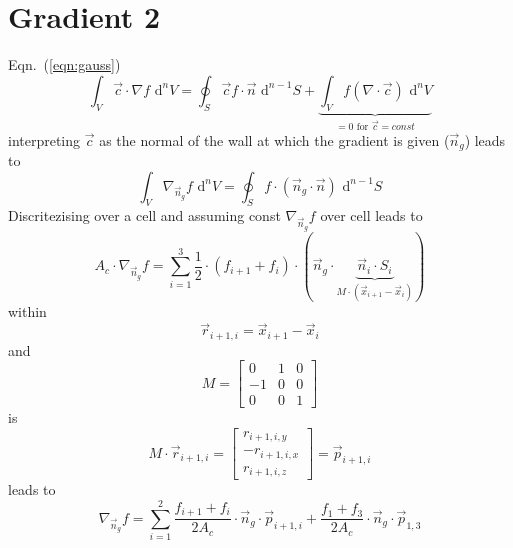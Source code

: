 \section{Gradient 2}
Eqn.~(\ref{eqn:gauss})
\begin{equation}
  \int_V \vec{c} \cdot \nabla f \,\, \mathrm{d}^n V = \oint_S \vec{c} f \cdot \vec{n} \,\, \mathrm{d}^{n-1}S + \underbrace{\int_V f (\nabla \cdot \vec{c}) \,\, \mathrm{d}^n V}_{=0 \text{ for } \vec{c} = const}
\end{equation}
interpreting $\vec{c}$ as the normal of the wall at which the gradient is given ($\vec{n}_g$) leads to
\begin{equation}
  \int_V \nabla_{\vec{n}_g} f \,\, \mathrm{d}^n V = \oint_S f \cdot (\vec{n}_g  \cdot \vec{n}) \,\, \mathrm{d}^{n-1}S
\end{equation}
Discritezising over a cell and assuming const $\nabla_{\vec{n}_g} f$ over cell leads to
\begin{equation}
  A_c \cdot \nabla_{\vec{n}_g}f  = \sum_{i=1}^3 \frac{1}{2} \cdot (f_{i + 1} + f_i) \cdot (\vec{n}_g  \cdot \underbrace{\vec{n}_i \cdot S_i}_{M \cdot (\vec{x}_{i + 1} - \vec{x}_{i})})
\end{equation}
within\begin{equation}
  \vec{r}_{i+1, i} = \vec{x}_{i + 1} - \vec{x}_{i}
\end{equation}
and
\begin{equation}
  M =
  \begin{bmatrix}
    0 & 1 & 0 \\
    -1 & 0 & 0 \\
    0 & 0 & 1
  \end{bmatrix}
\end{equation}
is
\begin{equation}
  M \cdot \vec{r}_{i+1, i} =
  \begin{bmatrix}
    r_{i+1, i, y} \\
    -r_{i+1, i, x} \\
    r_{i+1, i, z}
  \end{bmatrix}
  = \vec{p}_{i+1, i}
\end{equation}
leads to
\begin{equation}
  \nabla_{\vec{n}_g}f  = \sum_{i=1}^2   \frac{f_{i + 1} + f_i}{2 A_c} \cdot \vec{n}_g  \cdot \vec{p}_{i+1, i} + \frac{f_1 + f_3}{2 A_c} \cdot \vec{n}_g  \cdot \vec{p}_{1, 3}
\end{equation}
